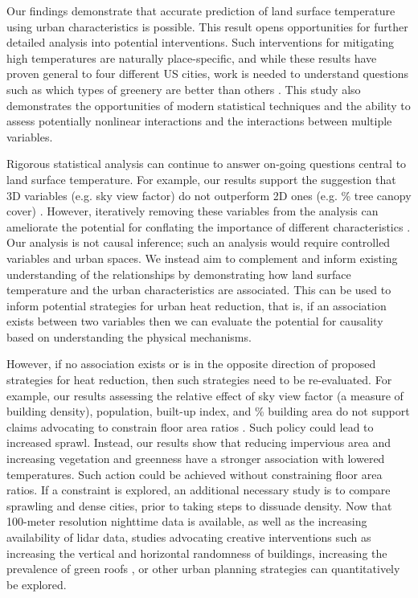 \documentclass[review]{elsarticle}
\begin{document}
Our findings demonstrate that accurate prediction of land surface temperature using urban characteristics is possible.
This result opens opportunities for further detailed analysis into potential interventions.
Such interventions for mitigating high temperatures are naturally place-specific, and while these results have proven general to four different US cities, work is needed to understand questions such as which types of greenery are better than others \cite{Gober2009-im}.
This study also demonstrates the opportunities of modern statistical techniques and the ability to assess potentially nonlinear interactions and the interactions between multiple variables. 

Rigorous statistical analysis can continue to answer on-going questions central to land surface temperature.
For example, our results support the suggestion that 3D variables (e.g. sky view factor) do not outperform 2D ones (e.g. \% tree canopy cover) \cite{Berger2017-lx}. 
However, iteratively removing these variables from the analysis can ameliorate the potential for conflating the importance of different characteristics \cite{Chun2017-mm}.
Our analysis is not causal inference; such an analysis would require controlled variables and urban spaces.
We instead aim to complement and inform existing understanding of the relationships by demonstrating how land surface temperature and the urban characteristics are associated.
This can be used to inform potential strategies for urban heat reduction, that is, if an association exists between two variables then we can evaluate the potential for causality based on understanding the physical mechanisms.

However, if no association exists or is in the opposite direction of proposed strategies for heat reduction, then such strategies need to be re-evaluated.
For example, our results assessing the relative effect of sky view factor (a measure of building density), population, built-up index, and \% building area do not support claims advocating to constrain floor area ratios \cite{Chun2017-mm}.
Such policy could lead to increased sprawl.
Instead, our results show that reducing impervious area and increasing vegetation and greenness have a stronger association with lowered temperatures.
Such action could be achieved without constraining floor area ratios.
If a constraint is explored, an additional necessary study is to compare sprawling and dense cities, prior to taking steps to dissuade density. 
Now that 100-meter resolution nighttime data is available, as well as the increasing availability of lidar data, studies advocating creative interventions such as increasing the vertical and horizontal randomness of buildings, increasing the prevalence of green roofs \cite{Gago2013-ta}, or other urban planning strategies can quantitatively be explored.
\end{document}
